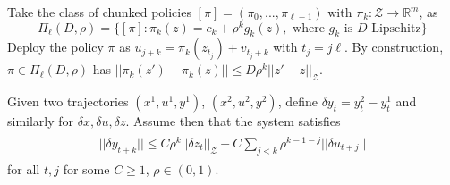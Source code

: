 \documentclass[final]{l4dc2026}
\newcommand{\lm}{\limits}
\newcommand{\R}{\mathbb{R}}
\newcommand{\eqspnoan}[2]{\begin{align}\tag{#1}\begin{split} #2 \end{split}\end{align}}
\begin{document}
Take the class of chunked policies $[\pi] = (\pi_0, ..., \pi_{\ell - 1})$ with $\pi_k: \mathcal{Z} \to \R^m$, as \[\Pi_{\ell}(D, \rho) = \{[\pi] : \pi_k(z) = c_k + \rho^kg_k(z), \text{ where } g_k \text{ is $D$-Lipschitz}\}\]
Deploy the policy $\pi$ as $u_{j + k} = \pi_k(z_{t_j}) + v_{t_j + k}$ with $t_j = j\ell$. By construction, $\pi \in \Pi_\ell(D, \rho)$ has $||\pi_k(z') - \pi_k(z)|| \le D\rho^k||z' - z||_\mathcal{Z}$. 

Given two trajectories $(x^1, u^1, y^1)$, $(x^2, u^2, y^2)$, define $\delta y_t = y^2_t - y^1_t$ and similarly for $\delta x, \delta u, \delta z$. Assume then that the system satisfies \eqspnoan{E$\delta$IOS}{||\delta y_{t+k}|| \le C\rho^k||\delta z_t||_\mathcal{Z} + C\sum\lm_{j < k}\rho^{k - 1 - j}||\delta u_{t + j}||}
for all $t, j$ for some $C \ge 1$, $\rho \in (0, 1)$.
\end{document}
